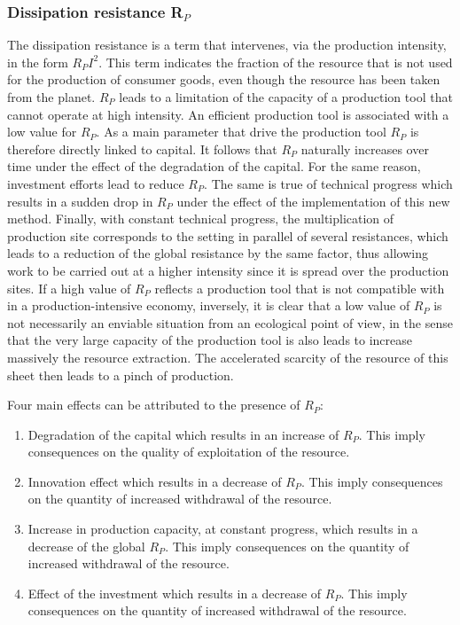 \documentclass[12pt,a4paper]{article}%
\begin{document}
\subsubsection{Dissipation resistance R$_{P}$}
The dissipation resistance is a term that intervenes, via the production intensity, in the form $R_{P}I^{2}$. This term indicates the fraction of the resource that is not used for the production of consumer goods, even though the resource has been taken from the planet. $R_{P}$ leads to a limitation of the capacity of a production tool that cannot operate at high intensity. An efficient production tool is associated with a low value for $R_{P}$. As a main parameter that drive the production tool $R_{P}$ is therefore directly linked to capital. It follows that $R_{P}$ naturally increases over time under the effect of the degradation of the capital. For the same reason, investment efforts lead to reduce $R_{P}$. The same is true of technical progress which results in a sudden drop in $R_{P}$ under the effect of the implementation of this new method. Finally, with constant technical progress, the multiplication of production site corresponds to the setting in parallel of several resistances, which leads to a reduction of the global resistance by the same factor, thus allowing work to be carried out at a higher intensity since it is spread over the production sites. If a high value of $R_{P}$ reflects a production tool that is not compatible with in a production-intensive economy, inversely, it is clear that a low value of $R_{P}$ is not necessarily an enviable situation from an ecological point of view, in the sense that the very large capacity of the production tool is also
leads to increase massively the resource extraction. The accelerated scarcity of the resource of this sheet then leads to a pinch of production.

\noindent Four main effects can be attributed to the presence of $R_{P}$:


\begin{enumerate}
	\item Degradation of the capital which results in an increase of $R_{P}$. This imply consequences on the quality of exploitation of the resource.
	
	\item Innovation effect which results in a decrease of $R_{P}$. This imply consequences on the quantity of increased withdrawal of the resource.
	
	\item Increase in production capacity, at constant progress, which results in a decrease of the global $R_{P}$. This imply consequences on the quantity of increased withdrawal of the resource.
	
	\item Effect of the investment which results in a decrease of $R_{P}$. This imply consequences on the quantity of increased withdrawal of the resource.
\end{enumerate}
\end{document}
